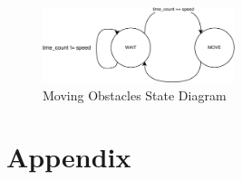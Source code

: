 \documentclass[journal, twocolumn, final,11pt,letterpaper]{IEEEtran}
\begin{document}
\begin{figure}[H]
	\centering
	\includegraphics[width=0.5\textwidth]{moving_state.png}
	\caption{Moving Obstacles State Diagram}
	\label{fig:moving-state}
\end{figure}


\section*{Appendix}




%
%     
\end{document}
